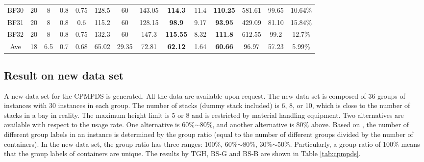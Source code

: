 \documentclass[review,3p,times,authoryear,12pt]{elsarticle}
\begin{document}
\begin{table}[!htb]
\begin{tabular}{c|c|c|c|c|c|c|c|c|c|c|c|c|c}
    BF30  & 20 & 8  & 0.8 & 0.75 & 128.5 & 60    & 143.05 &\textbf{ 114.3}& 11.4    & \textbf{110.25}& 581.61  & 99.65 & 10.64\%\\
    BF31  & 20 & 8  & 0.8 & 0.6  & 115.2 & 60    & 128.15 & \textbf{98.9} & 9.17    & \textbf{93.95} & 429.09  & 81.10 & 15.84\%\\
    BF32  & 20 & 8  & 0.8 & 0.75 & 132.3 & 60    & 147.3  & \textbf{115.55}& 8.32   & \textbf{111.8} & 612.55  & 99.2  & 12.7\%\\
    \hline
    Ave   & 18 & 6.5& 0.7 & 0.68 & 65.02 & 29.35 & 72.81  & \textbf{62.12}& 1.64    & \textbf{60.66} & 96.97   & 57.23 & 5.99\%\\
   \hline
\end{tabular}
\end{table}

\subsection {Result on new data set}

A new data set for the CPMPDS is generated. All the data are available upon request. %
The new data set is composed of 36 groups of instances with 30 instances in each group.
The number of stacks (dummy stack included) is 6, 8, or 10, which is close to the number of stacks in a bay in reality.
The maximum height limit is 5 or 8 and is restricted by material handling equipment.
Two alternatives are available with respect to the usage rate. One alternative is 60\%$\sim$80\%, and another alternative is 80\% above.
Based on \cite{BF2012}, the number of different group labels in an instance is determined by the group ratio (equal to the number of different groups divided by the number of containers).
In the new data set, the group ratio has three ranges: 100\%, 60\%$\sim$80\%, 30\%$\sim$50\%.
Particularly, a group ratio of 100\% means that the group labels of containers are unique.
The results by TGH, BS-G and BS-B are shown in Table \ref{tab:cpmpds}.
\end{document}
